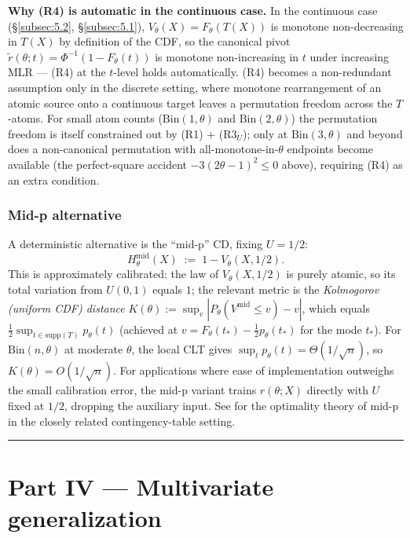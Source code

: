 \documentclass[11pt]{article}
\begin{document}
\textbf{Why (R4) is automatic in the continuous case.} In the continuous
case (\S\ref{subsec:5.2}, \S\ref{subsec:5.1}), \(V_\theta(X) = F_\theta(T(X))\)
is monotone non-decreasing in \(T(X)\) by definition of the CDF, so the
canonical pivot \(\tilde r(\theta; t) = \Phi^{-1}(1 - F_\theta(t))\) is
monotone non-increasing in \(t\) under increasing MLR --- (R4) at the
\(t\)-level holds automatically. (R4) becomes a non-redundant assumption
only in the discrete setting, where monotone rearrangement of an atomic
source onto a continuous target leaves a permutation freedom across the
\(T\)-atoms. For small atom counts (\(\mathrm{Bin}(1, \theta)\) and
\(\mathrm{Bin}(2, \theta)\)) the permutation freedom is itself
constrained out by (R1) + (R3\(_U\)); only at \(\mathrm{Bin}(3, \theta)\)
and beyond does a non-canonical permutation with all-monotone-in-\(\theta\)
endpoints become available (the perfect-square accident
\(-3(2\theta - 1)^2 \le 0\) above), requiring (R4) as an extra
condition.

\subsubsection{Mid-p alternative}\label{subsubsec:5.7.3}

A deterministic alternative is the ``mid-p'' CD, fixing \(U = 1/2\): \[
H^\mathrm{mid}_\theta(X) \;:=\; 1 - V_\theta(X, 1/2).
\] This is approximately calibrated: the law of \(V_\theta(X, 1/2)\)
is purely atomic, so its total variation from \(U(0,1)\) equals
\(1\); the relevant metric is the \emph{Kolmogorov (uniform CDF)
distance} \(K(\theta) := \sup_v |P_\theta(V^\mathrm{mid} \le v) - v|\),
which equals \(\tfrac{1}{2} \sup_{t \in \mathrm{supp}(T)} p_\theta(t)\)
(achieved at \(v = F_\theta(t_*) - \tfrac{1}{2} p_\theta(t_*)\) for the
mode \(t_*\)). For \(\mathrm{Bin}(n, \theta)\) at moderate \(\theta\),
the local CLT gives \(\sup_t p_\theta(t) = \Theta(1/\sqrt{n})\), so
\(K(\theta) = O(1/\sqrt{n})\). For applications where ease of
implementation outweighs the small calibration error, the mid-p variant
trains \(r(\theta; X)\) directly with \(U\) fixed at \(1/2\), dropping
the auxiliary input. See \citet{HwangYang2001} for the optimality theory
of mid-p in the closely related contingency-table setting.

\medskip\hrule\medskip

\section*{Part IV — Multivariate generalization}
\end{document}
